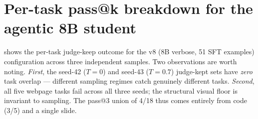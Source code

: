 \documentclass[11pt]{article}
\begin{document}
\section{Per-task pass@k breakdown for the agentic 8B student}
\label{app:per-task}

 shows the per-task judge-keep outcome for the v8 (8B verbose, 51 SFT examples) configuration across three independent samples. Two observations are worth noting. \emph{First}, the seed-42 ($T{=}0$) and seed-43 ($T{=}0.7$) judge-kept sets have \emph{zero} task overlap --- different sampling regimes catch genuinely different tasks. \emph{Second}, all five webpage tasks fail across all three seeds; the structural visual floor is invariant to sampling. The pass@3 union of 4/18 thus comes entirely from code (3/5) and a single slide.
\end{document}
